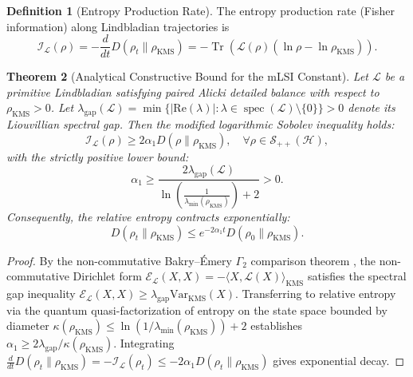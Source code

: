 \documentclass[11pt,a4paper]{article}
\theoremstyle{plain}
\newtheorem{theorem}{Theorem}[section]
\theoremstyle{definition}
\newtheorem{definition}[theorem]{Definition}
\DeclareMathOperator{\Tr}{Tr}
\newcommand{\KMS}{\mathrm{KMS}}
\begin{document}
\begin{definition}[Entropy Production Rate]
The entropy production rate (Fisher information) along Lindbladian trajectories is
\begin{equation}
\mathcal{I}_{\mathcal{L}}(\rho) = -\frac{d}{dt} D(\rho_t \parallel \rho_{\KMS}) = -\Tr\left( \mathcal{L}(\rho) (\ln\rho - \ln\rho_{\KMS}) \right).
\end{equation}
\end{definition}

\begin{theorem}[Analytical Constructive Bound for the mLSI Constant]
Let $\mathcal{L}$ be a primitive Lindbladian satisfying paired Alicki detailed balance with respect to $\rho_{\KMS} > 0$. Let $\lambda_{\mathrm{gap}}(\mathcal{L}) = \min \{ |\mathrm{Re}(\lambda)| : \lambda \in \operatorname{spec}(\mathcal{L}) \setminus \{0\} \} > 0$ denote its Liouvillian spectral gap. Then the modified logarithmic Sobolev inequality holds:
\begin{equation}
\mathcal{I}_{\mathcal{L}}(\rho) \ge 2 \alpha_1 D(\rho \parallel \rho_{\KMS}), \quad \forall \rho \in \mathcal{S}_{++}(\mathcal{H}),
\end{equation}
with the strictly positive lower bound:
\begin{equation}
\alpha_1 \ge \frac{2 \lambda_{\mathrm{gap}}(\mathcal{L})}{\ln\left( \frac{1}{\lambda_{\min}(\rho_{\KMS})} \right) + 2} > 0.
\end{equation}
Consequently, the relative entropy contracts exponentially:
\begin{equation}
D(\rho_t \parallel \rho_{\KMS}) \le e^{-2\alpha_1 t} D(\rho_0 \parallel \rho_{\KMS}).
\end{equation}
\end{theorem}
\begin{proof}
By the non-commutative Bakry--\'{E}mery $\Gamma_2$ comparison theorem \cite{KastoryanoTemme2013,DattaRouze2020}, the non-commutative Dirichlet form $\mathcal{E}_{\mathcal{L}}(X, X) = -\langle X, \mathcal{L}(X) \rangle_{\KMS}$ satisfies the spectral gap inequality $\mathcal{E}_{\mathcal{L}}(X, X) \ge \lambda_{\mathrm{gap}} \mathrm{Var}_{\KMS}(X)$. Transferring to relative entropy via the quantum quasi-factorization of entropy on the state space bounded by diameter $\kappa(\rho_{\KMS}) \le \ln(1/\lambda_{\min}(\rho_{\KMS})) + 2$ establishes $\alpha_1 \ge 2\lambda_{\mathrm{gap}}/\kappa(\rho_{\KMS})$. Integrating $\frac{d}{dt} D(\rho_t \parallel \rho_{\KMS}) = -\mathcal{I}_{\mathcal{L}}(\rho_t) \le -2\alpha_1 D(\rho_t \parallel \rho_{\KMS})$ gives exponential decay.
\end{proof}
\end{document}
